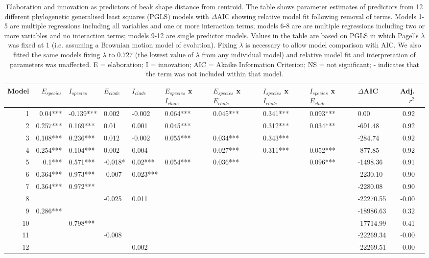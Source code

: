 \documentclass[12pt,letterpaper]{article}
\begin{document}
\begin{landscape}
\begin{table}[ht]
\centering
\small
   \begin{tabular}{rrllllllllrr}
     \hline
    Model & $E_{species}$ & $I_{species}$ & $E_{clade}$ & $I_{clade}$ & $E_{species}$ x $I_{clade}$ & $E_{species}$ x $E_{clade}$ & $I_{species}$ x $I_{clade}$ & $I_{species}$ x $E_{clade}$ & $\Delta$AIC & Adj. $r^2$ \\ 
     \hline
   1 & 0.04*** & -0.139*** & 0.002 & -0.002 & 0.064*** & 0.045*** & 0.341*** & 0.093*** & 0.00 & 0.92 \\ 
   2 & 0.257*** & 0.169*** & 0.01 & 0.001 & 0.045*** &  & 0.312*** & 0.034*** & -691.48 & 0.92 \\ 
   3 & 0.108*** & 0.236*** & 0.012 & -0.002 & 0.055*** & 0.034*** & 0.343*** &  & -284.74 & 0.92 \\ 
   4 & 0.254*** & 0.104*** & 0.002 & 0.004 &  & 0.027*** & 0.311*** & 0.052*** & -877.85 & 0.92 \\ 
   5 & 0.1*** & 0.571*** & -0.018* & 0.02*** & 0.054*** & 0.036*** &  & 0.096*** & -1498.36 & 0.91 \\ 
   6 & 0.364*** & 0.973*** & -0.007 & 0.023*** &  &  &  &  & -2230.10 & 0.90 \\ 
   7 & 0.364*** & 0.972*** &  &  &  &  &  &  & -2280.08 & 0.90 \\ 
   8 &  &  & -0.025 & 0.011 &  &  &  &  & -22270.55 & -0.00 \\ 
   9 & 0.286*** &  &  &  &  &  &  &  & -18986.63 & 0.32 \\ 
   10 &  & 0.798*** &  &  &  &  &  &  & -17714.99 & 0.41 \\ 
   11 &  &  & -0.008 &  &  &  &  &  & -22269.34 & -0.00 \\ 
   12 &  &  &  & 0.002 &  &  &  &  & -22269.51 & -0.00 \\ 
      \hline
   \end{tabular}
\caption{Elaboration and innovation as predictors of beak shape distance from centroid.
The table shows parameter estimates of predictors from 12 different phylogenetic generalised least squares (PGLS) models with $\Delta$AIC showing relative model fit following removal of terms. Models 1-5 are multiple regressions including all variables and one or more interaction terms; models 6-8 are are multiple regressions including two or more variables and no interaction terms; models 9-12 are single predictor models. Values in the table are based on PGLS in which Pagel’s $\lambda$ was fixed at 1 (i.e. assuming a Brownian motion model of evolution). Fixing $\lambda$ is necessary to allow model comparison with AIC. We also fitted the same models fixing $\lambda$ to 0.727 (the lowest value of $\lambda$ from any individual model) and relative model fit and interpretation of parameters was unaffected. E = elaboration; I = innovation; AIC = Akaike Information Criterion; NS = not significant; - indicates that the term was not included within that model.}
\label{Tab:pgls}
\end{table}
\end{landscape}
\end{document}
